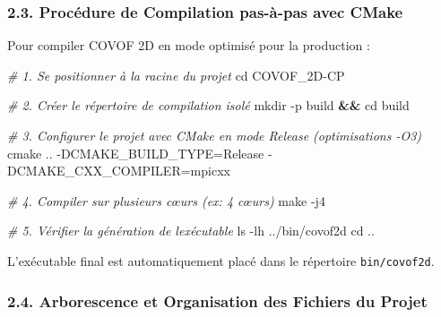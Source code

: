 \documentclass[
  french,
]{article}
\newenvironment{Shaded}{}{}
\newcommand{\AttributeTok}[1]{\textcolor[rgb]{0.49,0.56,0.16}{#1}}
\newcommand{\BuiltInTok}[1]{\textcolor[rgb]{0.00,0.50,0.00}{#1}}
\newcommand{\CommentTok}[1]{\textcolor[rgb]{0.38,0.63,0.69}{\textit{#1}}}
\newcommand{\FunctionTok}[1]{\textcolor[rgb]{0.02,0.16,0.49}{#1}}
\newcommand{\KeywordTok}[1]{\textcolor[rgb]{0.00,0.44,0.13}{\textbf{#1}}}
\newcommand{\NormalTok}[1]{#1}
\newcommand{\OperatorTok}[1]{\textcolor[rgb]{0.40,0.40,0.40}{#1}}
\begin{document}
\subsubsection{2.3. Procédure de Compilation pas-à-pas avec
CMake}\label{procuxe9dure-de-compilation-pas-uxe0-pas-avec-cmake}

Pour compiler COVOF 2D en mode optimisé pour la production :

\begin{Shaded}
\begin{Highlighting}[]
\CommentTok{\# 1. Se positionner à la racine du projet}
\BuiltInTok{cd}\NormalTok{ COVOF\_2D{-}CP}

\CommentTok{\# 2. Créer le répertoire de compilation isolé}
\FunctionTok{mkdir} \AttributeTok{{-}p}\NormalTok{ build }\KeywordTok{\&\&} \BuiltInTok{cd}\NormalTok{ build}

\CommentTok{\# 3. Configurer le projet avec CMake en mode Release (optimisations {-}O3)}
\FunctionTok{cmake}\NormalTok{ .. }\AttributeTok{{-}DCMAKE\_BUILD\_TYPE}\OperatorTok{=}\NormalTok{Release }\AttributeTok{{-}DCMAKE\_CXX\_COMPILER}\OperatorTok{=}\NormalTok{mpicxx}

\CommentTok{\# 4. Compiler sur plusieurs cœurs (ex: 4 cœurs)}
\FunctionTok{make} \AttributeTok{{-}j4}

\CommentTok{\# 5. Vérifier la génération de l\textquotesingle{}exécutable}
\FunctionTok{ls} \AttributeTok{{-}lh}\NormalTok{ ../bin/covof2d}
\BuiltInTok{cd}\NormalTok{ ..}
\end{Highlighting}
\end{Shaded}

L'exécutable final est automatiquement placé dans le répertoire
\texttt{bin/covof2d}.

\subsubsection{2.4. Arborescence et Organisation des Fichiers du
Projet}\label{arborescence-et-organisation-des-fichiers-du-projet}
\end{document}
